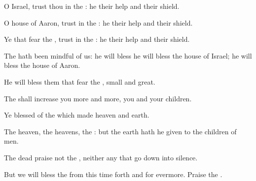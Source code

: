 {\Q {}O
Israel,
trust thou in the
{}: he
{} their
help and their
shield.


\par }{\Q {}O
house of
Aaron,
trust in the
{}: he
{} their
help and their
shield.


\par }{\Q {}Ye that
fear the
{},
trust in the
{}: he
{} their
help and their
shield.


\par }{\Q {}The
{} hath been
mindful of us: he will
bless
{} he will
bless the
house of
Israel; he will
bless the
house of
Aaron.


\par }{\Q {}He will
bless them that
fear the
{},
{}
small and
great.


\par }{\Q {}The
{} shall
increase you more and more, you and your
children.


\par }{\Q {}Ye
{}
blessed of the
{} which
made
heaven and
earth.


\par }{\Q {}The
heaven,
{} the
heavens,
{} the
{}: but the
earth hath he
given to the
children of
men.


\par }{\Q {}The
dead
praise not the
{}, neither any that go
down into
silence.


\par }{\Q {}But we will
bless the
{} from this time forth and
for
evermore.
Praise the
{}.




\par }
